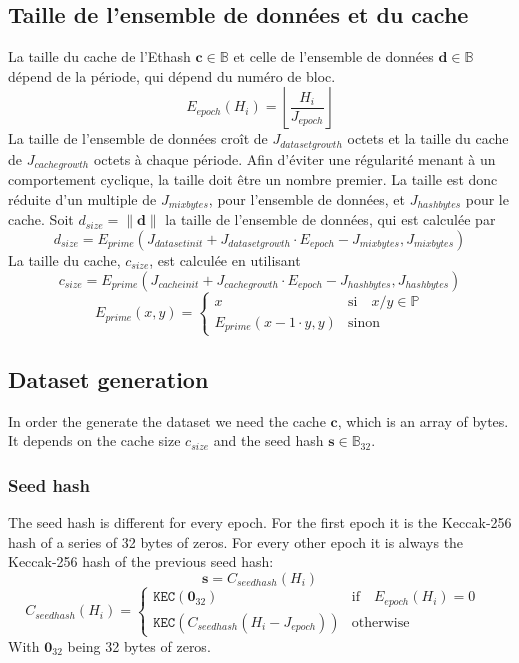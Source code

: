 \documentclass[9pt,oneside]{amsart}
\begin{document}
\subsection{Taille de l'ensemble de données et du cache}
La taille du cache de l'Ethash $\mathbf{c} \in \mathbb{B}$ et celle de l'ensemble de données $\mathbf{d} \in \mathbb{B}$ dépend de la période, qui dépend du numéro de bloc.
\begin{equation}
 E_{epoch}(H_i) = \left\lfloor\frac{H_i}{J_{epoch}}\right\rfloor
\end{equation}
La taille de l'ensemble de données croît de $J_{datasetgrowth}$ octets et la taille du cache de $J_{cachegrowth}$ octets à chaque période. Afin d'éviter une régularité menant à un comportement cyclique, la taille doit être un nombre premier. La taille est donc réduite d'un multiple de $J_{mixbytes}$, pour l'ensemble de données, et $J_{hashbytes}$ pour le cache.
Soit $d_{size} = \lVert \mathbf{d} \rVert$ la taille de l'ensemble de données, qui est calculée par
\begin{equation}
 d_{size} = E_{prime}(J_{datasetinit} + J_{datasetgrowth} \cdot E_{epoch} - J_{mixbytes}, J_{mixbytes})
\end{equation}
La taille du cache, $c_{size}$, est calculée en utilisant
\begin{equation}
 c_{size} = E_{prime}(J_{cacheinit} + J_{cachegrowth} \cdot E_{epoch} - J_{hashbytes}, J_{hashbytes})
\end{equation}
\begin{equation}
 E_{prime}(x, y) = \begin{cases}
x & \text{si} \quad x / y \in \mathbb{P} \\
E_{prime}(x - 1 \cdot y, y) & \text{sinon}
\end{cases}
\end{equation}
\subsection{Dataset generation}
In order the generate the dataset we need the cache $\mathbf{c}$, which is an array of bytes. It depends on the cache size  $c_{size}$ and the seed hash $\mathbf{s} \in \mathbb{B}_{32}$.
\subsubsection{Seed hash}
The seed hash is different for every epoch. For the first epoch it is the Keccak-256 hash of a series of 32 bytes of zeros. For every other epoch it is always the Keccak-256 hash of the previous seed hash:
\begin{equation}
 \mathbf{s} = C_{seedhash}(H_i)
\end{equation}
\begin{equation}
 C_{seedhash}(H_i) = \begin{cases}
\texttt{KEC}(\mathbf{0}_{32}) & \text{if} \quad E_{epoch}(H_i) = 0 \quad  \\
\texttt{KEC}(C_{seedhash}(H_i - J_{epoch})) & \text{otherwise}
\end{cases}
\end{equation}
With $\mathbf{0}_{32}$ being 32 bytes of zeros.
\end{document}
